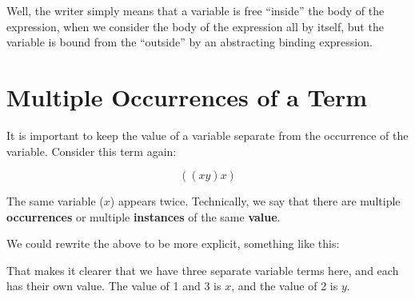 \documentclass{book}
\numberwithin{equation}{chapter}
\newcommand{\vocab}{\textbf}
\begin{document}
Well, the writer simply means that a variable is free ``inside'' the body of the expression, when we consider the body of the expression all by itself, but the variable is bound from the ``outside'' by an abstracting binding expression.


\section{Multiple Occurrences of a Term}

It is important to keep the value of a variable separate from the occurrence of the variable. Consider this term again:

\begin{equation}
((x y) x)
\end{equation}

\noindent
The same variable ($x$) appears twice. Technically, we say that there are multiple \vocab{occurrences} or multiple \vocab{instances} of the same \vocab{value}. 

We could rewrite the above to be more explicit, something like this:

\begin{center}
\end{center}

\noindent
That makes it clearer that we have three separate variable terms here, and each has their own value. The value of 1 and 3 is $x$, and the value of 2 is $y$.


\end{document}

